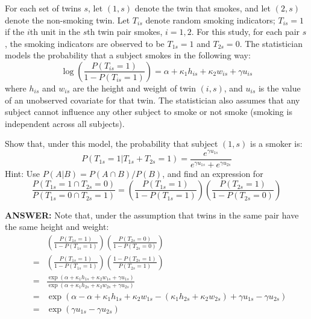 \documentclass{article}
\begin{document}
\begin{itemize}
\begin{itemize}
          For each set of twins $s$, let $(1,s)$ denote the twin that smokes,
          and let $(2,s)$ denote the non-smoking twin.
          Let $T_{is}$ denote random smoking indicators;
          $T_{is} = 1$ if the $i$th unit in the $s$th twin pair smokes, $i = 1,2$.
          For this study, for each pair $s$, 
          the smoking indicators are observed to be $T_{1s} = 1$
          and $T_{2s} = 0$.
          The statistician models the probability that a subject smokes in the following way:
          \begin{equation}
            \log\left( 
              \frac{P(T_{is} = 1)}{1 - P(T_{is} = 1)}
            \right) = \alpha + \kappa_1 h_{is} + \kappa_2 w_{is} + \gamma u_{is}
            \label{probassign}
          \end{equation}
          where $h_{is}$ and $w_{is}$ are the height and weight of twin $(i,s)$,
          and $u_{is}$ is the value of an unobserved covariate for that twin.
          The statistician also assumes that any subject cannot influence
          any other subject to smoke or not smoke
          (smoking is independent across all subjects).
           
          Show that, under this model, the probability
          that subject $(1,s)$ is a smoker is:
          \begin{equation}
            P(T_{1s} = 1| T_{1s} + T_{2s} = 1) 
            = \frac{e^{\gamma u_{1s}}}{e^{\gamma u_{1s}} + e^{\gamma u_{2s}}}
            \label{aprobques}
          \end{equation}
          Hint: Use $P(A | B) = P(A\cap B)/P(B)$, and find an expression for
          $$
            \frac{P(T_{1s} = 1 \cap T_{2s} = 0)}{P(T_{1s} = 0 \cap T_{2s} = 1)} = 
            \left(\frac{P(T_{1s} = 1)}{1 - P(T_{1s} = 1)}\right)
            \left(\frac{P(T_{2s} = 1)}{1 - P(T_{2s} = 0)}\right)
          $$
          
          \textbf{ANSWER:}
          Note that, under the assumption that twins 
          in the same pair have the same height and weight:
          \begin{eqnarray*}
            &&\left(\frac{P(T_{1s} = 1)}{1 - P(T_{1s} = 1)}\right)
            \left(\frac{P(T_{2s} = 0)}{1 - P(T_{2s} = 0)}\right) \\
            &=&\left(\frac{P(T_{1s} = 1)}{1 - P(T_{1s} = 1)}\right)
            \left(\frac{1- P(T_{2s} =1)}{P(T_{2s} = 1)}\right)\\
            &=& \frac{\exp( \alpha + \kappa_1 h_{1s} + \kappa_2 w_{1s} + \gamma u_{1s})}
            {\exp( \alpha + \kappa_1 h_{2s} + \kappa_2 w_{2s} + \gamma u_{2s})}\\
            &=& \exp( \alpha - \alpha + \kappa_1 h_{1s}  + \kappa_2 w_{1s} 
            - (\kappa_1 h_{2s} + \kappa_2 w_{2s} )+ \gamma u_{1s} - \gamma u_{2s})\\
            &=& \exp(\gamma u_{1s} - \gamma u_{2s})
          \end{eqnarray*}
          

\end{itemize}
\end{itemize}
\end{document}
